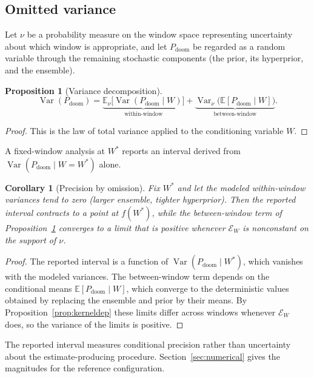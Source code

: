 \documentclass[11pt]{article}
\newtheorem{proposition}{Proposition}[section]
\newtheorem{corollary}{Corollary}[section]
\theoremstyle{remark}
\newcommand{\PD}{P_{\mathrm{doom}}}
\newcommand{\Ex}{\mathbb{E}}
\begin{document}
\subsection{Omitted variance}

Let $\nu$ be a probability measure on the window space representing uncertainty about which window is appropriate, and let $\PD$ be regarded as a random variable through the remaining stochastic components (the prior, its hyperprior, and the ensemble).

\begin{proposition}[Variance decomposition]\label{prop:vardec}
\begin{equation}
\operatorname{Var}(\PD)=\underbrace{\Ex_\nu\bigl[\operatorname{Var}(\PD\mid W)\bigr]}_{\text{within-window}}+\underbrace{\operatorname{Var}_\nu\bigl(\Ex[\PD\mid W]\bigr)}_{\text{between-window}}.
\end{equation}
\end{proposition}
\begin{proof}
This is the law of total variance applied to the conditioning variable $W$. \qedhere
\end{proof}

A fixed-window analysis at $W^{\ast}$ reports an interval derived from $\operatorname{Var}(\PD\mid W=W^{\ast})$ alone.

\begin{corollary}[Precision by omission]\label{cor:omission}
Fix $W^{\ast}$ and let the modeled within-window variances tend to zero (larger ensemble, tighter hyperprior). Then the reported interval contracts to a point at $f(W^{\ast})$, while the between-window term of Proposition~\ref{prop:vardec} converges to a limit that is positive whenever $\mathcal{E}_W$ is nonconstant on the support of $\nu$.
\end{corollary}
\begin{proof}
The reported interval is a function of $\operatorname{Var}(\PD\mid W^{\ast})$, which vanishes with the modeled variances. The between-window term depends on the conditional means $\Ex[\PD\mid W]$, which converge to the deterministic values obtained by replacing the ensemble and prior by their means. By Proposition~\ref{prop:kerneldep} these limits differ across windows whenever $\mathcal{E}_W$ does, so the variance of the limits is positive. \qedhere
\end{proof}

The reported interval measures conditional precision rather than uncertainty about the estimate-producing procedure. Section~\ref{sec:numerical} gives the magnitudes for the reference configuration.
\end{document}
